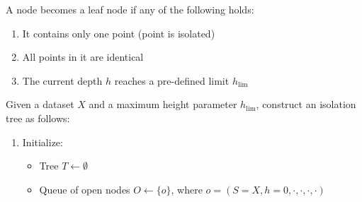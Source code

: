\documentclass{article}
\begin{document}
A node becomes a leaf node if any of the following holds:
\begin{enumerate}
    \item It contains only one point (point is isolated)
    \item All points in it are identical
    \item The current depth $h$ reaches a pre-defined limit $h_{\text{lim}}$
\end{enumerate}

Given a dataset $X$ and a maximum height parameter $h_{\text{lim}}$, construct an isolation tree as follows:

\begin{enumerate}
    \item Initialize:
    \begin{itemize}
        \item Tree $T \gets \emptyset$
        \item Queue of open nodes $O \gets \{ o \}$, where $o = (S = X, h = 0, \cdot, \cdot, \cdot, \cdot)$
    \end{itemize}
    

\end{enumerate}
\end{document}
